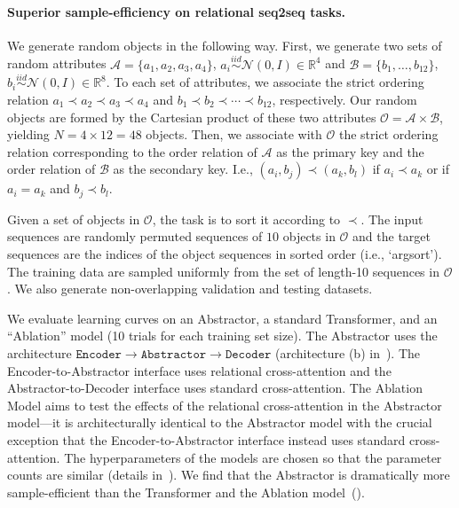 \paragraph{Superior sample-efficiency on relational seq2seq tasks.}
We generate random objects in the following way. First, we generate two sets of random attributes $\mathcal{A} = \{a_1, a_2, a_3, a_4\}$, $a_i \overset{iid}{\sim} \mathcal{N}(0, I) \in \mathbb{R}^{4}$ and $\mathcal{B} = \{b_1, \ldots, b_{12}\}$, $b_i \overset{iid}{\sim} \mathcal{N}(0, I) \in \mathbb{R}^{8}$. To each set of attributes, we associate the strict ordering relation $a_1 \prec a_2 \prec a_3 \prec a_4$ and $b_1 \prec b_2 \prec \cdots \prec b_{12}$, respectively. Our random objects are formed by the Cartesian product of these two attributes $\mathcal{O} = \mathcal{A} \times \mathcal{B}$, yielding $N = 4 \times 12 = 48$ objects.
Then, we associate with $\mathcal{O}$ the strict ordering relation corresponding to the order relation of $\mathcal{A}$ as the primary key and the order relation of $\mathcal{B}$ as the secondary key. I.e., $(a_i, b_j) \prec (a_k, b_l)$ if $a_i \prec a_k$ or if $a_i = a_k$ and $b_j \prec b_l$.

Given a set of objects in $\mathcal{O}$, the task is to sort it according to $\prec$. The input sequences are randomly permuted sequences of $10$ objects in $\mathcal{O}$ and the target sequences are the indices of the object sequences in sorted order (i.e., `argsort'). The training data are sampled uniformly from the set of length-10 sequences in $\mathcal{O}$. We also generate non-overlapping validation and testing datasets.

We evaluate learning curves on an Abstractor, a standard Transformer, and an ``Ablation'' model (10 trials for each training set size). The Abstractor uses the architecture $\texttt{Encoder} \to \texttt{Abstractor} \to \texttt{Decoder}$ (architecture (b) in~). The Encoder-to-Abstractor interface uses relational cross-attention and the Abstractor-to-Decoder interface uses standard cross-attention. The Ablation Model aims to test the effects of the relational cross-attention in the Abstractor model---it is architecturally identical to the Abstractor model with the crucial exception that the Encoder-to-Abstractor interface instead uses standard cross-attention. The hyperparameters of the models are chosen so that the parameter counts are similar (details in~). We find that the Abstractor is dramatically more sample-efficient than the Transformer and the Ablation model~().

